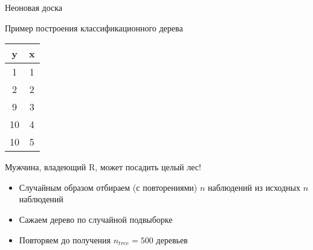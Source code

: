 \documentclass[ignorenonframetext,]{beamer}
\begin{document}
\begin{frame}{Неоновая доска}

Пример построения классификационного дерева

\begin{longtable}[c]{@{}cc@{}}
\toprule
\begin{minipage}[b]{0.05\columnwidth}\centering\strut
y
\strut\end{minipage} &
\begin{minipage}[b]{0.05\columnwidth}\centering\strut
x
\strut\end{minipage}\tabularnewline
\midrule
\endhead
\begin{minipage}[t]{0.05\columnwidth}\centering\strut
1
\strut\end{minipage} &
\begin{minipage}[t]{0.05\columnwidth}\centering\strut
1
\strut\end{minipage}\tabularnewline
\begin{minipage}[t]{0.05\columnwidth}\centering\strut
2
\strut\end{minipage} &
\begin{minipage}[t]{0.05\columnwidth}\centering\strut
2
\strut\end{minipage}\tabularnewline
\begin{minipage}[t]{0.05\columnwidth}\centering\strut
9
\strut\end{minipage} &
\begin{minipage}[t]{0.05\columnwidth}\centering\strut
3
\strut\end{minipage}\tabularnewline
\begin{minipage}[t]{0.05\columnwidth}\centering\strut
10
\strut\end{minipage} &
\begin{minipage}[t]{0.05\columnwidth}\centering\strut
4
\strut\end{minipage}\tabularnewline
\begin{minipage}[t]{0.05\columnwidth}\centering\strut
10
\strut\end{minipage} &
\begin{minipage}[t]{0.05\columnwidth}\centering\strut
5
\strut\end{minipage}\tabularnewline
\bottomrule
\end{longtable}

\end{frame}

\begin{frame}{Мужчина, владеющий R, может посадить целый лес!}

\begin{itemize}
\item
  Случайным образом отбираем (с повторениями) \(n\) наблюдений из
  исходных \(n\) наблюдений
\item
  Сажаем дерево по случайной подвыборке
\item
  Повторяем до получения \(n_{tree}=500\) деревьев
\end{itemize}

\end{frame}
\end{document}
